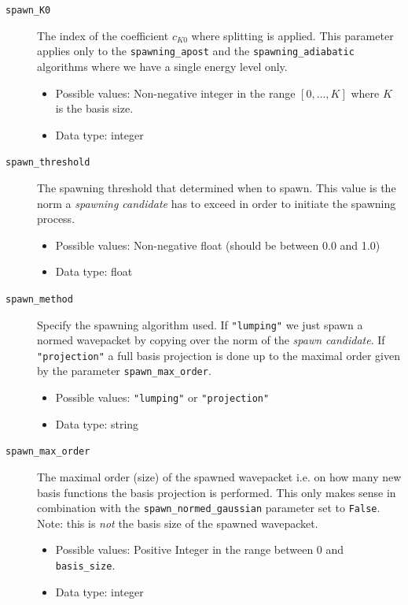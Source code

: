 \documentclass[a4paper,10pt]{report}
\begin{document}
\begin{description}
  \item[\texttt{spawn\_K0}] The index of the coefficient $c_{K0}$ where splitting
  is applied. This parameter applies only to the \texttt{spawning\_apost} and the
  \texttt{spawning\_adiabatic} algorithms where we have a single energy level only.
  \begin{itemize}
    \item Possible values: Non-negative integer in the range $\left[0, \ldots, K\right]$ where $K$
          is the basis size.
    \item Data type: integer
  \end{itemize}

  \item[\texttt{spawn\_threshold}] The spawning threshold that determined when to spawn.
  This value is the norm a \emph{spawning candidate} has to exceed in order to
  initiate the spawning process.
  \begin{itemize}
    \item Possible values: Non-negative float (should be between 0.0 and 1.0)
  \item Data type: float
  \end{itemize}

  \item[\texttt{spawn\_method}] Specify the spawning algorithm used.
  If \texttt{"lumping"} we just spawn a normed wavepacket by copying over the norm
  of the \emph{spawn candidate}. If \texttt{"projection"} a full basis projection is done
  up to the maximal order given by the parameter \texttt{spawn\_max\_order}.
  \begin{itemize}
    \item Possible values: \texttt{"lumping"} or \texttt{"projection"}
    \item Data type: string
  \end{itemize}

  \item[\texttt{spawn\_max\_order}] The maximal order (size) of the spawned wavepacket
  i.e. on how many new basis functions the basis projection is performed.
  This only makes sense in combination with the \texttt{spawn\_normed\_gaussian}
  parameter set to \texttt{False}. Note: this is \emph{not} the basis size of the
  spawned wavepacket.
  \begin{itemize}
    \item Possible values: Positive Integer in the range between 0 and \texttt{basis\_size}.
    \item Data type: integer
  \end{itemize}


\end{description}
\end{document}
